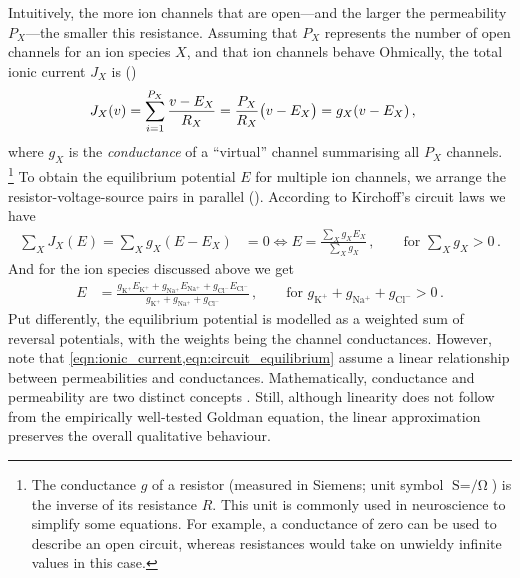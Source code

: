 Intuitively, the more ion channels that are open---and the larger the permeability $P_X$---the smaller this resistance.
Assuming that $P_X$ represents the number of open channels for an ion species $X$, and that ion channels behave Ohmically, the total ionic current $J_X$ is  ()
\begin{align}
	J_X(v) &= \sum_{i = 1}^{P_X} \frac{{v} - E_X}{R_X} = \frac{P_X}{R_X} \bigl( {v} - E_X \bigr) = g_X ({v} - E_X)\,,
	\label{eqn:ionic_current}
\end{align}
where $g_X$ is the \emph{conductance} of a \enquote{virtual} channel summarising all $P_X$ channels.%
\footnote{The conductance $g$ of a resistor (measured in Siemens; unit symbol $\si{\siemens} = \si{\per\ohm}$) is the inverse of its resistance $R$.
This unit is commonly used in neuroscience to simplify some equations.
For example, a conductance of zero can be used to describe an open circuit, whereas resistances would take on unwieldy infinite values in this case.}
To obtain the equilibrium potential $E$ for multiple ion channels, we arrange the resistor-voltage-source pairs in parallel ().
According to Kirchoff's circuit laws we have
\begin{align}
	\sum_X J_X(E) = \sum_X g_X (E - E_X) &= 0 \Leftrightarrow E = \frac{\sum_X g_X E_X}{\sum_X g_X} \,, \quad \quad \text{for } \sum_X g_X > 0 \,.
	\label{eqn:circuit_equilibrium}
\end{align}
And for the ion species discussed above we get
\begin{align}
	E &= \frac{g_\mathrm{K^+} E_\mathrm{K^+} + g_\mathrm{Na^+} E_\mathrm{Na^+} + g_\mathrm{Cl^-} E_\mathrm{Cl^-}}{g_\mathrm{K^+} + g_\mathrm{Na^+} + g_\mathrm{Cl^-}} \,,  \quad \quad \text{for } g_\mathrm{K^+} + g_\mathrm{Na^+} + g_\mathrm{Cl^-} > 0 \,.
	\label{eqn:circuit_equilibrium_ions}
\end{align}
Put differently, the equilibrium potential is modelled as a weighted sum of reversal potentials, with the weights being the channel conductances.
However, note that \cref{eqn:ionic_current,eqn:circuit_equilibrium} assume a linear relationship between permeabilities and conductances.
Mathematically, conductance and permeability are two distinct concepts \citep{enderle2011bioelectric}.
Still, although linearity does not follow from the empirically well-tested Goldman equation, the linear approximation preserves the overall qualitative behaviour.%

